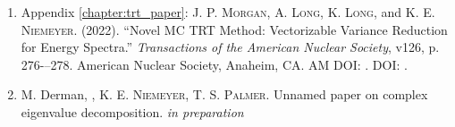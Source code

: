 \begin{enumerate}
    \item Appendix \ref{chapter:trt_paper}: \textsc{J. P. Morgan}, \textsc{A. Long}, \textsc{K. Long}, and \textsc{K. E. Niemeyer}. (2022). “Novel MC TRT Method: Vectorizable Variance Reduction for Energy Spectra.” \emph{Transactions of the American Nuclear Society}, v126, p. 276-–278. American Nuclear Society, Anaheim, CA. AM DOI: . DOI: .

    \item M. Derman, , \textsc{K. E. Niemeyer}, \textsc{T. S. Palmer}. Unnamed paper on complex eigenvalue decomposition. \emph{in preparation}
\end{enumerate}